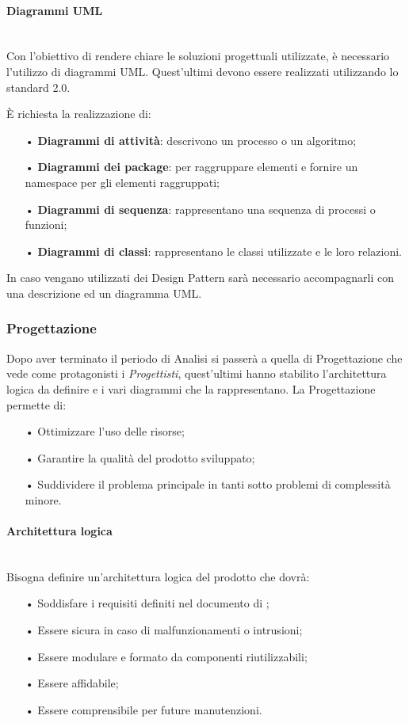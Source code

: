 \paragraph{Diagrammi UML}\mbox{}\\
Con l'obiettivo di rendere chiare le soluzioni progettuali utilizzate, è necessario l'utilizzo di {diagrammi UML}. Quest'ultimi devono essere realizzati utilizzando lo {standard} 2.0.

È richiesta la realizzazione di:
\begin{itemize}
	\item[•] \textbf{Diagrammi di attività}: descrivono un processo o un algoritmo;
	\item[•] \textbf{Diagrammi dei package}: per raggruppare elementi e fornire un {namespace} per gli elementi raggruppati;
	\item[•] \textbf{Diagrammi di sequenza}: rappresentano una sequenza di processi o funzioni;
	\item[•] \textbf{Diagrammi di classi}: rappresentano le classi utilizzate e le loro relazioni.
\end{itemize}
In caso vengano utilizzati dei {Design Pattern} sarà necessario accompagnarli con una descrizione ed un diagramma UML.

\subsubsection{Progettazione}\mbox{}
Dopo aver terminato il periodo di Analisi si passerà a quella di Progettazione che vede come 
protagonisti i \textit{Progettisti}, quest'ultimi hanno stabilito l'{architettura} logica 
da definire e i vari diagrammi che la rappresentano.
La Progettazione permette di: 
\begin{itemize}
\item[•] Ottimizzare l'uso delle risorse;
\item[•] Garantire la qualità del prodotto sviluppato;
\item[•] Suddividere il problema principale in tanti sotto problemi di complessità minore.
\end{itemize}

\paragraph{Architettura logica}\mbox{}\\
Bisogna definire un'architettura logica del prodotto che dovrà: 
\begin{itemize}
\item[•] Soddisfare i requisiti definiti nel documento di \AdR;
\item[•] Essere sicura in caso di malfunzionamenti o intrusioni;
\item[•] Essere {modulare} e formato da componenti riutilizzabili;
\item[•] Essere affidabile;
\item[•] Essere comprensibile per future manutenzioni.
\end{itemize}


